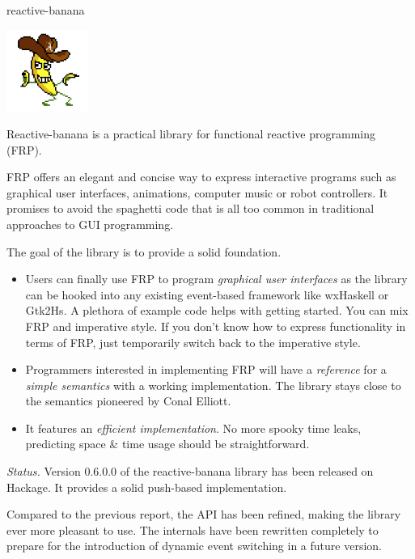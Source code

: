 \begin{hcarentry}[updated]{reactive-banana}
\makeheader

\begin{center}
\includegraphics[width=0.2\textwidth]{html/banana.jpg}
\end{center}

Reactive-banana is a practical library for functional reactive programming (FRP).

FRP offers an elegant and concise way to express interactive programs such as graphical user interfaces, animations, computer music or robot controllers. It promises to avoid the spaghetti code that is all too common in traditional approaches to GUI programming.

The goal of the library is to provide a solid foundation.
\begin{itemize}
\item Users can finally use FRP to program \emph{graphical user interfaces} as the library can be hooked into any existing event-based framework like wxHaskell or Gtk2Hs. A plethora of example code helps with getting started. You can mix FRP and imperative style. If you don't know how to express functionality in terms of FRP, just temporarily switch back to the imperative style.
\item Programmers interested in implementing FRP will have a \emph{reference} for a \emph{simple semantics} with a working implementation. The library stays close to the semantics pioneered by Conal Elliott.
\item It features an \emph{efficient implementation}. No more spooky time leaks, predicting space \& time usage should be straightforward.
\end{itemize}

\emph{Status.} Version 0.6.0.0 of the reactive-banana library has been released on Hackage. It provides a solid push-based implementation.

Compared to the previous report, the API has been refined, making the library ever more pleasant to use. The internals have been rewritten completely to prepare for the introduction of dynamic event switching in a future version.


\end{hcarentry}
